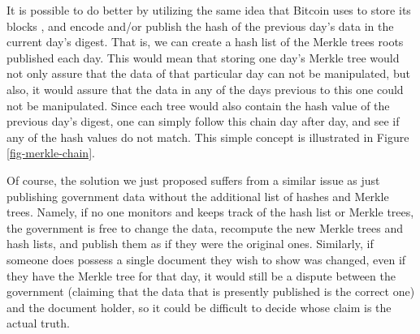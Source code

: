 It is possible to do better by utilizing the same idea that Bitcoin uses to store its blocks \cite{whitepaper}, and encode and/or publish the hash of the previous day's data in the current day's digest. That is, we can create a hash list of the Merkle trees roots published each day. This would mean that storing one day's Merkle tree would not only assure that the data of that particular day can not be manipulated, but also, it would assure that the data in any of the days previous to this one could not be manipulated.  Since each tree would also contain the hash value of the previous day's digest, one can simply follow this chain day after day, and see if any of the hash values do not match. This simple concept is illustrated in Figure \ref{fig-merkle-chain}.


\medskip
{} Of course, the solution we just proposed suffers from a similar issue as just publishing government data without the additional list of hashes and Merkle trees. Namely, if no one monitors and keeps track of the hash list or Merkle trees, the government is free to change the data, recompute the new Merkle trees and hash lists, and publish them as if they were the original ones. Similarly, if someone does possess a single document they wish to show was changed, even if they have the Merkle tree for that day, it would still be a dispute between the government (claiming that the data that is presently published is the correct one) and the document holder, so it could be difficult to decide whose claim is the actual truth.


